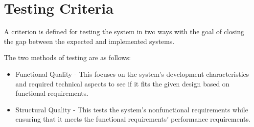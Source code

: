 \section{Testing Criteria}

A criterion is defined for testing the system in two ways with the goal of closing the gap between the expected and implemented systems.

\noindent The two methods of testing are as follows:


 \begin{itemize}[noitemsep,nolistsep]
    \item Functional Quality - This focuses on the system's development characteristics and required technical aspects to see if it fits the given design based on functional requirements.
    \item Structural Quality - This tests the system's nonfunctional requirements while ensuring that it meets the functional requirements' performance requirements.
\end{itemize}